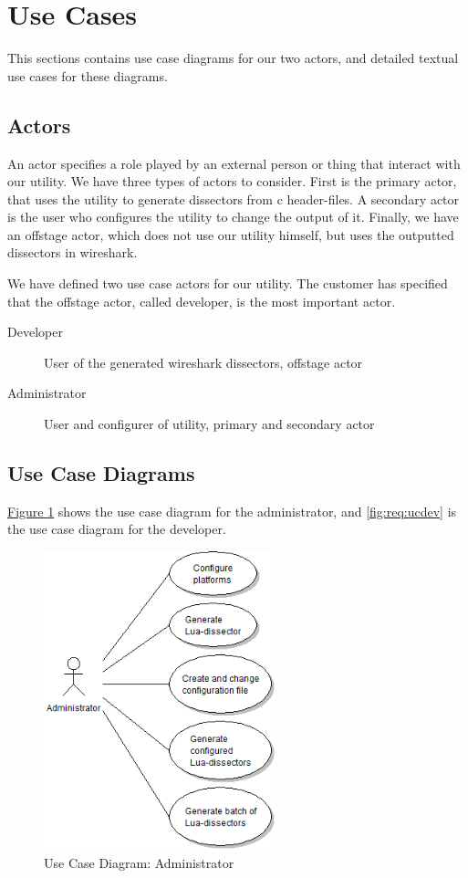 \section{Use Cases}
\label{sec:req:usecases}
This sections contains use case diagrams for our two actors, and detailed
textual use cases for these diagrams.

\subsection{Actors}
An actor specifies a role played by an external person or thing that interact
with our \gls{utility}. We have three types of actors to consider. First is the
primary actor, that uses the \gls{utility} to generate \glspl{dissector} from 
\Gls{c} header-files. A secondary actor is the user who configures the
\gls{utility} to change the output of it. Finally, we have an offstage actor, which
does not use our \gls{utility} himself, but uses the outputted \glspl{dissector} in \Gls{wireshark}.

We have defined two use case actors for our \gls{utility}. The customer has specified
that the offstage actor, called developer, is the most important actor.
\begin{description}
	\item[Developer] User of the generated \Gls{wireshark} \glspl{dissector}, offstage actor
	\item[Administrator] User and configurer of \gls{utility}, primary and secondary actor
\end{description}

\subsection{Use Case Diagrams}
\hyperref[fig:req:ucadm]{Figure \ref*{fig:req:ucadm}} shows the use case
diagram for the administrator, and \autoref{fig:req:ucdev} is the use case
diagram for the developer.
\begin{figure}[htbp]
	\center
	\includegraphics[width=0.6\textwidth]{./planning/img/uc_administrator}
	\caption{Use Case Diagram: Administrator\label{fig:req:ucadm}}
\end{figure}


